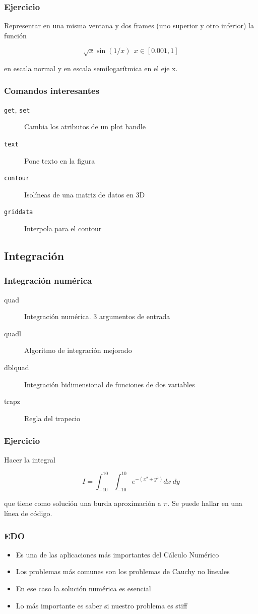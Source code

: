 \documentclass[12pt]{beamer}
\begin{document}
\begin{frame}
\frametitle{Ejercicio}

Representar en una misma ventana y dos frames (uno superior y otro
inferior) la función

\[ \sqrt{x} \sin(1/x)\ \ x \in[0.001,1]  \]

en escala normal y en escala semilogarítmica en el eje x.
\end{frame}

\begin{frame}
\frametitle{Comandos interesantes}
\begin{description}
\item[\texttt{get}, \texttt{set}] Cambia los atributos de un plot
  handle
\item[\texttt{text}] Pone texto en la figura
\item[\texttt{contour}] Isolíneas de una matriz de datos en 3D
\item[\texttt{griddata}] Interpola para el contour
\end{description}
\end{frame}

\subsection{Integración}

\begin{frame}
\frametitle{Integración numérica}
\begin{description}
\item[quad] Integración numérica. 3 argumentos de entrada
\item[quadl] Algoritmo de integración mejorado
\item[dblquad] Integración bidimensional de funciones de dos variables
\item[trapz] Regla del trapecio
\end{description}
\end{frame}

\begin{frame}
  \frametitle{Ejercicio}
  Hacer la integral

  \[ I=\int_{-10}^{10}\int_{-10}^{10}e^{-(x^2+y^2)}dx\ dy \]
  
  que tiene como solución una burda aproximación a $\pi$.  Se puede
  hallar en una línea de código.
\end{frame}

\begin{frame}
\frametitle{EDO}
\begin{itemize}
\item Es una de las aplicaciones más importantes del Cálculo Numérico
\item Los problemas más comunes son los problemas de Cauchy no lineales
\item En ese caso la solución numérica es esencial
\item Lo más importante es saber si nuestro problema es stiff
\end{itemize}
\end{frame}
\end{document}
